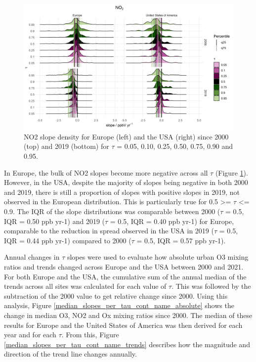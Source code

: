 \documentclass[journal abbreviation, manuscript]{copernicus}
\begin{document}
\begin{figure}[h!]
\includegraphics[width=12cm]{plots/no2_density_ridges_by_tau_continent_2000_2019.png}
\caption{NO2 slope density for Europe (left) and the USA (right) since 2000 (top) and 2019 (bottom) for $\tau$ = 0.05, 0.10, 0.25, 0.50, 0.75, 0.90 and 0.95.}
\label{no2_ridge_plot}
\end{figure}

In Europe, the bulk of NO2 slopes become more negative across all $\tau$ (Figure \ref{no2_ridge_plot}). However, in the USA, despite the majority of slopes being negative in both 2000 and 2019, there is still a proportion of slopes with positive slopes in 2019, not observed in the European distribution. This is particularly true for 0.5 >= $\tau$ <= 0.9. The IQR of the slope distributions was comparable between 2000 ($\tau$ = 0.5, IQR = 0.50 ppb yr-1) and 2019 ($\tau$ = 0.5, IQR = 0.40 ppb yr-1) for Europe, comparable to the reduction in spread observed in the USA in 2019 ($\tau$ = 0.5, IQR = 0.44 ppb yr-1) compared to 2000 ($\tau$ = 0.5, IQR = 0.57 ppb yr-1).


Annual changes in $\tau$ slopes were used to evaluate how absolute urban O3 mixing ratios and trends changed across Europe and the USA between 2000 and 2021. For both Europe and the USA, the cumulative sum of the annual median of the trends across all sites was calculated for each value of $\tau$. This was followed by the subtraction of the 2000 value to get relative change since 2000. Using this analysis, Figure \ref{median_slopes_per_tau_cont_name_absolute} shows the change in median O3, NO2 and Ox mixing ratios since 2000. The median of these results for Europe and the United States of America was then derived for each year and for each $\tau$. From this, Figure \ref{median_slopes_per_tau_cont_name_trends} describes how the magnitude and direction of the trend line changes annually.
\end{document}
